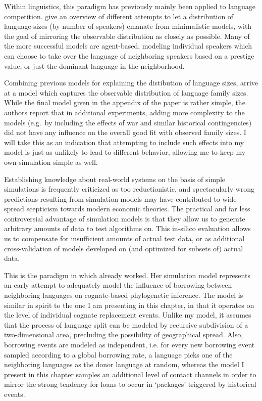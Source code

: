 Within linguistics, this paradigm has previously mainly been applied to language competition. \cite{schulze_ea_2008} give an overview of different attempts to let a distribution of language sizes (by number of speakers) emanate from minimalistic models, with the goal of mirroring the observable distribution as closely as possible. Many of the more successful models are agent-based, modeling individual speakers which can choose to take over the language of neighboring speakers based on a prestige value, or just the dominant language in the neighborhood.

Combining previous models for explaining the distibution of language sizes, \cite{oliveira_ea_2008} arrive at a model which captures the observable distribution of language family sizes. While the final model given in the appendix of the paper is rather simple, the authors report that in additional experiments, adding more complexity to the models (e.g.\ by including the effects of war and similar historical contingencies) did not have any influence on the overall good fit with observed family sizes. I will take this as an indication that attempting to include such effects into my model is just as unlikely to lead to different behavior, allowing me to keep my own simulation simple as well.

Establishing knowledge about real-world systems on the basis of simple simulations is frequently criticized as too reductionistic, and spectacularly wrong predictions resulting from simulation models may have contributed to wide-spread scepticism towards modern economic theories. The practical and far less controversial advantage of simulation models is that they allow us to generate arbitrary amounts of data to test algorithms on. This in-silico evaluation allows us to compensate for insufficient amounts of actual test data, or as additional cross-validation of models developed on (and optimized for subsets of) actual data.

This is the paradigm in which \cite{embleton1986} already worked. Her simulation model represents an early attempt to adequately model the influence of borrowing between neighboring languages on cognate-based phylogenetic inference. The model is similar in spirit to the one I am presenting in this chapter, in that it operates on the level of individual cognate replacement events. Unlike my model, it assumes that the process of language split can be modeled by recursive subdivision of a two-dimensional area, precluding the possibility of geographical spread. Also, borrowing events are modeled as independent, i.e. for every new borrowing event sampled according to a global borrowing rate, a language picks one of the neighboring languages as the donor language at random, whereas the model I present in this chapter samples an additional level of contact channels in order to mirror the strong tendency for loans to occur in `packages' triggered by historical events. 

